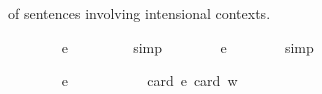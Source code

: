 \begin{isabellebody}
\begin{isamarkuptext}
{{  of sentences involving intensional contexts.}}%
\end{isamarkuptext}\isamarkuptrue%
\ \ \isamarkupfalse%
\ {\isachardoublequoteopen}{\isasymlfloor}\isactrlbold {\isasymforall}{\isasymalpha}{\isachardot}\ {\isacharparenleft}{\isacharparenleft}{\isasymlambda}{\isasymbeta}{\isachardot}\ \isactrlbold {\isasymbox}{\isacharparenleft}{\isasymalpha}\ {\isasymbeta}{\isacharparenright}{\isacharparenright}\ {\isacharparenleft}{\isasymtau}{\isacharcolon}{\isacharcolon}{\isasymlangle}e{\isasymrangle}{\isacharparenright}{\isacharparenright}\ \ \isactrlbold {\isasymleftrightarrow}\ \isactrlbold {\isasymbox}{\isacharparenleft}{\isacharparenleft}{\isasymlambda}{\isasymbeta}{\isachardot}\ {\isacharparenleft}{\isasymalpha}\ {\isasymbeta}{\isacharparenright}{\isacharparenright}\ {\isasymtau}{\isacharparenright}{\isasymrfloor}{\isachardoublequoteclose}%
\ %
%
\isamarkupfalse%
\ simp%
%
%
\isanewline
\ \ \isamarkupfalse%
\ {\isachardoublequoteopen}{\isasymlfloor}\isactrlbold {\isasymforall}{\isasymalpha}{\isachardot}\ {\isacharparenleft}{\isacharparenleft}{\isasymlambda}{\isasymbeta}{\isachardot}\ \isactrlbold {\isasymbox}{\isacharparenleft}{\isasymalpha}\ {\isasymbeta}{\isacharparenright}{\isacharparenright}\ {\isacharparenleft}{\isasymtau}{\isacharcolon}{\isacharcolon}{\isasymup}{\isasymlangle}e{\isasymrangle}{\isacharparenright}{\isacharparenright}\ \isactrlbold {\isasymleftrightarrow}\ \isactrlbold {\isasymbox}{\isacharparenleft}{\isacharparenleft}{\isasymlambda}{\isasymbeta}{\isachardot}\ {\isacharparenleft}{\isasymalpha}\ {\isasymbeta}{\isacharparenright}{\isacharparenright}\ {\isasymtau}{\isacharparenright}{\isasymrfloor}{\isachardoublequoteclose}%
\ %
%
\isamarkupfalse%
\ simp%
%
%
%
\begin{isamarkuptext}%
%
\end{isamarkuptext}\isamarkuptrue%
\ \ \isamarkupfalse%
\ {\isachardoublequoteopen}{\isasymlfloor}\isactrlbold {\isasymforall}{\isasymalpha}{\isachardot}\ {\isacharparenleft}{\isacharparenleft}{\isasymlambda}{\isasymbeta}{\isachardot}\ \isactrlbold {\isasymbox}{\isacharparenleft}{\isasymalpha}\ {\isasymbeta}{\isacharparenright}{\isacharparenright}\ \isactrlbold {\isasymdown}{\isacharparenleft}{\isasymtau}{\isacharcolon}{\isacharcolon}{\isasymup}{\isasymlangle}e{\isasymrangle}{\isacharparenright}{\isacharparenright}\ \isactrlbold {\isasymleftrightarrow}\ \isactrlbold {\isasymbox}{\isacharparenleft}{\isacharparenleft}{\isasymlambda}{\isasymbeta}{\isachardot}\ {\isacharparenleft}{\isasymalpha}\ {\isasymbeta}{\isacharparenright}{\isacharparenright}\ \isactrlbold {\isasymdown}{\isasymtau}{\isacharparenright}{\isasymrfloor}{\isachardoublequoteclose}\ \isanewline
\ \ \ \ \isamarkupfalse%
{\isacharbrackleft}card\ e{\isacharequal}{}{\isacharcomma}\ card\ w{\isacharequal}{}{\isacharbrackright}%
\ %
%
\isamarkupfalse%
\ %
%
%
%
%

\end{isabellebody}
